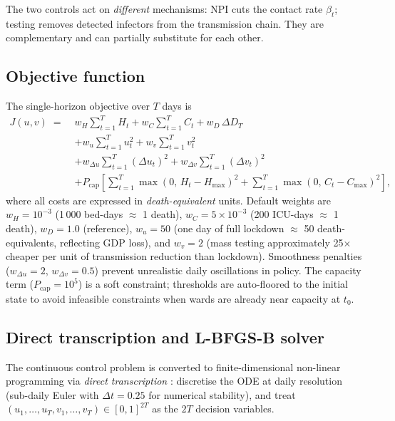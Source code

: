 \documentclass[11pt]{article}
\begin{document}
The two controls act on \emph{different} mechanisms: NPI cuts the contact
rate $\beta_t$; testing removes detected infectors from the transmission
chain.  They are complementary and can partially substitute for each other.

\subsection{Objective function}
\label{sec:objective}

The single-horizon objective over $T$ days is
\begin{align}
  J(u,v) \;=\;&
    w_H \sum_{t=1}^T H_t
  + w_C \sum_{t=1}^T C_t
  + w_D\,\Delta D_T \nonumber\\
  &+ w_u \sum_{t=1}^T u_t^2
  + w_v \sum_{t=1}^T v_t^2 \nonumber\\
  &+ w_{\Delta u}\sum_{t=1}^T(\Delta u_t)^2
  + w_{\Delta v}\sum_{t=1}^T(\Delta v_t)^2 \nonumber\\
  &+ P_{\mathrm{cap}}\!\left[
      \sum_{t=1}^T \max(0,\,H_t-H_{\max})^2
      + \sum_{t=1}^T \max(0,\,C_t-C_{\max})^2
    \right],
  \label{eq:objective}
\end{align}
where all costs are expressed in \emph{death-equivalent} units.
Default weights are $w_H=10^{-3}$ (1\,000 bed-days $\approx$ 1 death),
$w_C=5\times10^{-3}$ (200 ICU-days $\approx$ 1 death),
$w_D=1.0$ (reference), $w_u=50$ (one day of full lockdown
$\approx$ 50 death-equivalents, reflecting GDP loss), and
$w_v=2$ (mass testing approximately 25$\times$ cheaper per unit of
transmission reduction than lockdown).
Smoothness penalties ($w_{\Delta u}=2$, $w_{\Delta v}=0.5$) prevent
unrealistic daily oscillations in policy.
The capacity term ($P_{\mathrm{cap}}=10^5$) is a soft constraint;
thresholds are auto-floored to the initial state to avoid infeasible
constraints when wards are already near capacity at $t_0$.

\subsection{Direct transcription and L-BFGS-B solver}
\label{sec:solver}

The continuous control problem is converted to finite-dimensional
non-linear programming via \emph{direct transcription}
\cite{betts2010}: discretise the ODE at daily resolution (sub-daily
Euler with $\Delta t=0.25$ for numerical stability), and treat
$(u_1,\ldots,u_T,v_1,\ldots,v_T)\in[0,1]^{2T}$ as the $2T$ decision
variables.
\end{document}
